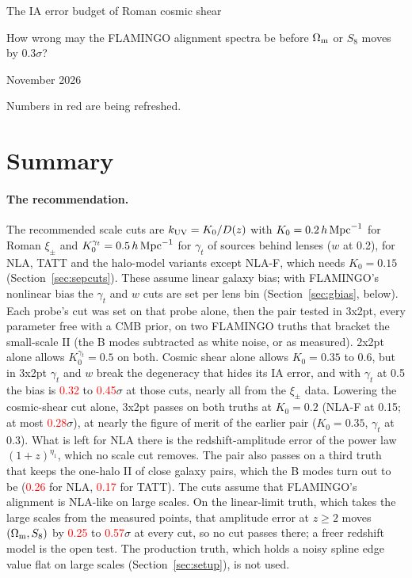 \documentclass[11pt]{article}
\newcommand{\hMpc}{\,h\,{\rm Mpc}^{-1}}
\newcommand{\kuv}{k_{\rm UV}}
\newcommand{\Om}{\Omega_{\rm m}}
\newif\ifnumbersfinal
\newcommand{\refresh}[1]{\ifnumbersfinal#1\else\textcolor{red}{#1}\fi}
\newcommand{\CPrecNLA}{\refresh{0.26}}
\newcommand{\CPrecTATT}{\refresh{0.17}}
\newcommand{\LLampThi}{\refresh{0.57}}
\newcommand{\LLampCSlo}{\refresh{0.25}}
\newcommand{\SCcombSOneLo}{\refresh{0.32}}
\newcommand{\SCcombEBHi}{\refresh{0.45}}
\newcommand{\SCfinalMax}{\refresh{0.28}}
\newcommand{\Tol}{0.3}
\begin{document}
\begin{center}
  {\LARGE The IA error budget of Roman cosmic shear\par}
  \vspace{0.6em}
  {\large How wrong may the FLAMINGO alignment spectra be before
    $\Om$ or $S_8$ moves by \Tol$\sigma$?\par}
  \vspace{0.6em}
  {\large November 2026\par}
  \ifnumbersfinal\else
    \vspace{0.6em}
    {\color{red}Numbers in red are being refreshed.\par}
  \fi
\end{center}
\vspace{1em}

\section{Summary}
\label{sec:summary}

\paragraph{The recommendation.}
The recommended scale cuts are $\kuv = K_0/D(z)$ with $K_0 = 0.2\hMpc$ for
Roman $\xi_\pm$ and $K_0^{\gamma_t} = 0.5\hMpc$ for $\gamma_t$ of sources
behind lenses ($w$ at 0.2), for NLA, TATT and the halo-model variants
except NLA-F, which needs $K_0 = 0.15$ (Section~\ref{sec:sepcuts}). These
assume linear galaxy bias; with FLAMINGO's nonlinear bias the $\gamma_t$ and
$w$ cuts are set per lens bin (Section~\ref{sec:gbias}, below). Each probe's cut was set on that probe alone,
then the pair tested in 3x2pt, every parameter free with a CMB prior, on two
FLAMINGO truths that bracket the small-scale II (the B modes subtracted as
white noise, or as measured). 2x2pt alone allows $K_0^{\gamma_t} = 0.5$ on
both. Cosmic shear alone allows $K_0 = 0.35$ to 0.6, but in 3x2pt
$\gamma_t$ and $w$ break the degeneracy that hides its IA error, and with
$\gamma_t$ at 0.5 the bias is \SCcombSOneLo{} to \SCcombEBHi$\sigma$ at
those cuts, nearly all from the $\xi_\pm$ data. Lowering the cosmic-shear
cut alone, 3x2pt passes on both truths at $K_0 = 0.2$ (NLA-F at 0.15; at most
\SCfinalMax$\sigma$), at nearly the figure of merit of the earlier pair
($K_0 = 0.35$, $\gamma_t$ at 0.3). What is left for NLA there is the
redshift-amplitude error of the power law $(1+z)^{\eta_1}$, which no scale
cut removes. The pair also passes on a third truth that keeps the one-halo
II of close galaxy pairs, which the B modes turn out to be (\CPrecNLA{} for
NLA, \CPrecTATT{} for TATT). The cuts assume that FLAMINGO's alignment is
NLA-like on large scales. On the linear-limit truth, which takes the large scales from the
measured points, that amplitude error at $z \ge 2$ moves $(\Om, S_8)$ by
\LLampCSlo{} to \LLampThi$\sigma$ at every cut, so no cut passes there; a
freer redshift model is the open test. The production truth, which holds a
noisy spline edge value flat on large scales (Section~\ref{sec:setup}), is
not used.
\end{document}

